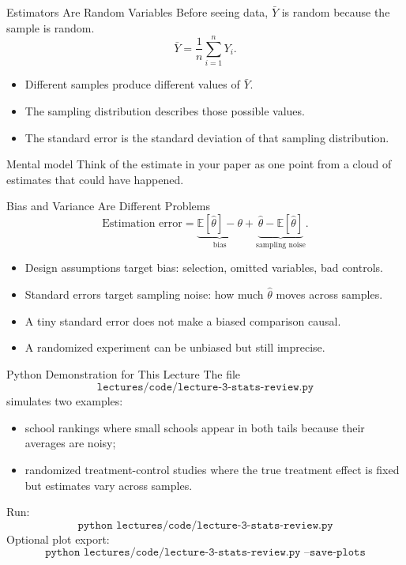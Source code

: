 \documentclass[11pt,aspectratio=169]{beamer}
\newcommand{\E}{\mathbb{E}}
\newcommand{\derivbutton}[1]{\vspace{0.4em}\hfill\hyperlink{app:#1}{\beamerbutton{Appendix details}}}
\begin{document}
\begin{frame}{Estimators Are Random Variables}
  \hypertarget{main:estimator-rv}{}
  Before seeing data, \(\bar{Y}\) is random because the sample is random.
  \[
    \bar{Y}
    =
    \frac{1}{n}\sum_{i=1}^n Y_i.
  \]
  \begin{itemize}
    \item Different samples produce different values of \(\bar{Y}\).
    \item The sampling distribution describes those possible values.
    \item The standard error is the standard deviation of that sampling distribution.
  \end{itemize}
  \begin{block}{Mental model}
    Think of the estimate in your paper as one point from a cloud of estimates that could have happened.
  \end{block}
  \derivbutton{sampling-distribution}
\end{frame}

\begin{frame}{Bias and Variance Are Different Problems}
  \[
    \text{Estimation error}
    =
    \underbrace{\E[\hat{\theta}]-\theta}_{\text{bias}}
    +
    \underbrace{\hat{\theta}-\E[\hat{\theta}]}_{\text{sampling noise}}.
  \]
  \begin{itemize}
    \item Design assumptions target bias: selection, omitted variables, bad controls.
    \item Standard errors target sampling noise: how much \(\hat{\theta}\) moves across samples.
    \item A tiny standard error does not make a biased comparison causal.
    \item A randomized experiment can be unbiased but still imprecise.
  \end{itemize}
\end{frame}

\begin{frame}{Python Demonstration for This Lecture}
  The file
  \[
    \texttt{lectures/code/lecture-3-stats-review.py}
  \]
  simulates two examples:
  \begin{itemize}
    \item school rankings where small schools appear in both tails because their averages are noisy;
    \item randomized treatment-control studies where the true treatment effect is fixed but estimates vary across samples.
  \end{itemize}
  \vspace{0.3em}
  Run:
  \[
    \texttt{python lectures/code/lecture-3-stats-review.py}
  \]
  Optional plot export:
  \[
    \texttt{python lectures/code/lecture-3-stats-review.py --save-plots}
  \]
\end{frame}
\end{document}
